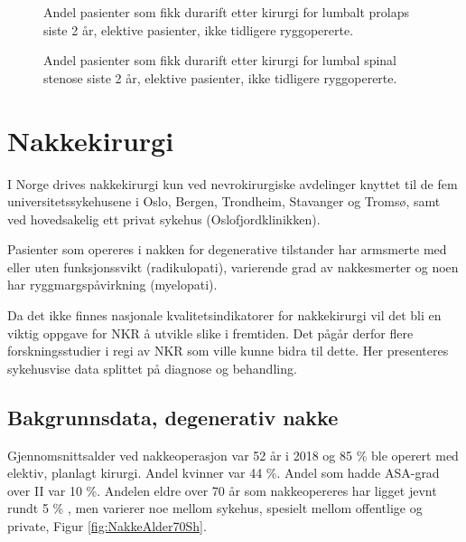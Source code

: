 \documentclass [norsk,a4paper,twoside]{article}\usepackage[]{graphicx}\usepackage[]{color}
\begin{document}
\begin{figure}[ht]
      \caption{\label{fig:DuraPro} Andel pasienter som fikk durarift etter kirurgi for lumbalt prolaps siste 2 år, 
      elektive pasienter, ikke tidligere ryggopererte.}
      \end{figure}
      
\begin{figure}[ht]
\caption{\label{fig:DuraSS} Andel pasienter som fikk durarift etter kirurgi for lumbal 
                  spinal stenose siste 2 år, elektive pasienter, ikke tidligere ryggopererte.}
\end{figure}

\clearpage



\section{Nakkekirurgi}

I Norge drives nakkekirurgi kun ved nevrokirurgiske avdelinger knyttet til de fem
universitetssykehusene i Oslo, Bergen, Trondheim, Stavanger og Tromsø, samt ved
hovedsakelig ett privat sykehus (Oslofjordklinikken).

Pasienter som opereres i nakken for degenerative tilstander har armsmerte med eller 
uten funksjonssvikt (radikulopati), varierende grad av nakkesmerter og noen har ryggmargspåvirkning (myelopati). 

Da  det ikke finnes nasjonale kvalitetsindikatorer for nakkekirurgi vil det bli en
viktig oppgave for NKR å utvikle slike i fremtiden. Det pågår derfor flere forskningsstudier i regi av NKR som ville kunne bidra til dette. 
Her presenteres sykehusvise data splittet på diagnose og behandling.




\subsection{Bakgrunnsdata, degenerativ nakke}


Gjennomsnittsalder ved nakkeoperasjon var 52 år i 2018 og 85 \% 
ble operert med elektiv, planlagt kirurgi. Andel kvinner var  44 \%.
Andel som hadde ASA-grad over II var 10 \%. Andelen eldre over 70 år som nakkeopereres 
har ligget jevnt 
rundt 5 \% , men varierer noe mellom sykehus, spesielt mellom offentlige og private, 
Figur \ref{fig:NakkeAlder70Sh}.
\end{document}
